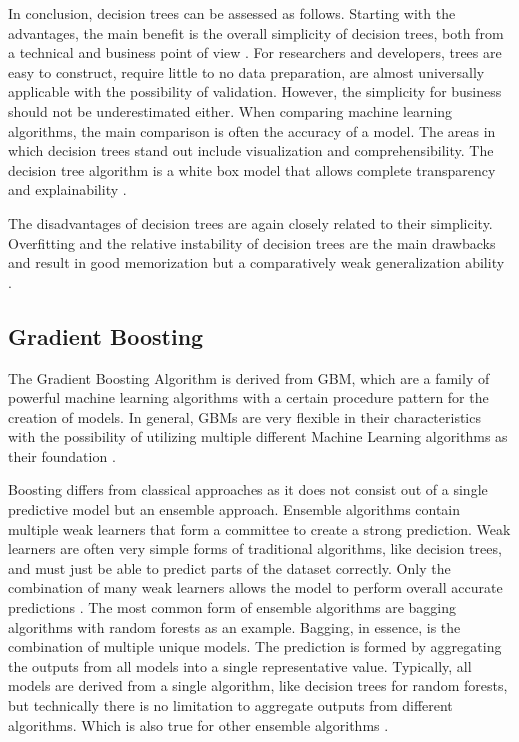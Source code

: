 In conclusion, decision trees can be assessed as follows. Starting with the advantages,
the main benefit is the overall simplicity of decision trees, both from a technical and 
business point of view \cite[p.339]{James2021}. For researchers and developers, trees are easy to construct, require little
to no data preparation, are almost universally applicable with the possibility of validation. 
However, the simplicity for business should not be underestimated either. When comparing machine
learning algorithms, the main comparison is often the accuracy of a model. The areas in which 
decision trees stand out include visualization and comprehensibility. The decision tree algorithm 
is a white box model that allows complete transparency and explainability \cite[10.10.]{scikit-decision_tree}. 

The disadvantages of decision trees are again closely related to their simplicity. Overfitting and 
the relative instability of decision trees are the main drawbacks and result in good memorization 
but a comparatively weak generalization ability \cite[p.340]{James2021} \cite[10.10.]{scikit-decision_tree}.

\subsection{Gradient Boosting}
\label{sec:Gradient Boosting}


The Gradient Boosting Algorithm is derived from \ac{GBM}, which are a family of 
powerful machine learning algorithms with a certain procedure pattern for the creation of models. 
In general, \acp{GBM} are very flexible in their characteristics with the possibility of utilizing 
multiple different Machine Learning algorithms as their foundation \cite{Natekin2013}.

Boosting differs from classical approaches as it does not consist out of a single predictive 
model but an ensemble approach. Ensemble algorithms contain multiple weak learners that form a 
committee to create a strong prediction. Weak learners are often very simple forms of traditional 
algorithms, like decision trees, and must just be able to predict parts of the dataset correctly. 
Only the combination of many weak learners allows the model to perform overall accurate 
predictions \cite{parr2022gb_explained_dtt} \cite[p.1f]{Buhlmann2004Bagging}. The most common form of ensemble algorithms are bagging algorithms with random 
forests as an example. Bagging, in essence, is the combination of multiple unique models. The 
prediction is formed by aggregating the outputs from all models into a single representative 
value. Typically, all models are derived from a single algorithm, like decision trees for random 
forests, but technically there is no limitation to aggregate outputs from different algorithms. 
Which is also true for other ensemble algorithms \cite[p.2]{Buhlmann2004Bagging}. 

